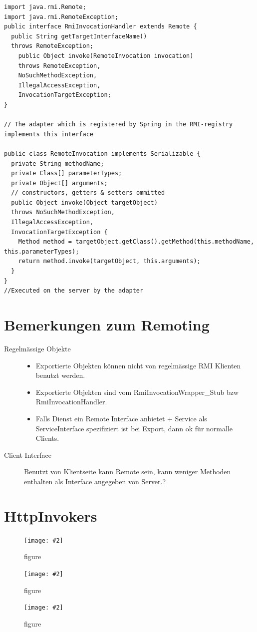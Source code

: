 \documentclass[a4paper,10pt]{scrreprt}
\newcommand{\pic}[2][figure]{\begin{figure}[h]
 \centering
 \texttt{[image: \#2]}
 \caption{#1}
\end{figure}
}
\begin{document}
\begin{lstlisting}[caption=Spring Remoting Client Code]
 import java.rmi.Remote;
import java.rmi.RemoteException;
public interface RmiInvocationHandler extends Remote {
  public String getTargetInterfaceName()
  throws RemoteException;
    public Object invoke(RemoteInvocation invocation)
    throws RemoteException,
    NoSuchMethodException,
    IllegalAccessException,
    InvocationTargetException;
}

// The adapter which is registered by Spring in the RMI-registry implements this interface

public class RemoteInvocation implements Serializable {
  private String methodName;
  private Class[] parameterTypes;
  private Object[] arguments;
  // constructors, getters & setters ommitted
  public Object invoke(Object targetObject)
  throws NoSuchMethodException,
  IllegalAccessException,
  InvocationTargetException {
    Method method = targetObject.getClass().getMethod(this.methodName, this.parameterTypes);
    return method.invoke(targetObject, this.arguments);
  }
}
//Executed on the server by the adapter
\end{lstlisting}



\section{Bemerkungen zum Remoting}
\begin{description}
 \item [Regelmässige Objekte]
 \begin{itemize}
  \item Exportierte Objekten können nicht von regelmässige RMI Klienten benutzt werden.
  \item Exportierte Objekten sind vom RmiInvocationWrapper\_Stub bzw RmiInvocationHandler.
  \item Falls Dienst ein Remote Interface anbietet + Service als ServiceInterface spezifiziert ist bei Export, dann ok für normalle Clients.
 \end{itemize}
\item[Client Interface] Benutzt von Klientseite kann Remote sein, kann weniger Methoden enthalten als Interface angegeben von Server.?
\end{description}

\section{HttpInvokers}
\pic{hpinv.png}
\pic{hesp.png}
\pic{burp.png}
\end{document}

